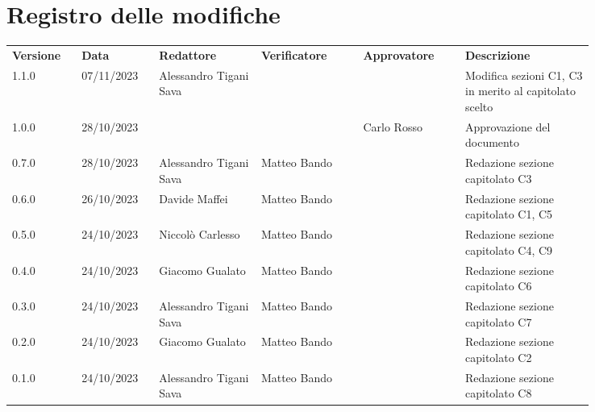 \section*{Registro delle modifiche}
{
\renewcommand{\arraystretch}{1.5}
\scriptsize
\begin{tabular}{p{0.10\linewidth}p{0.10\linewidth}p{0.15\linewidth}p{0.15\linewidth}p{0.15\linewidth}p{0.19\linewidth}}
    \textbf{Versione}   & \textbf{Data} & \textbf{Redattore}     & \textbf{Verificatore} & \textbf{Approvatore}  & \textbf{Descrizione}  \\
    1.1.0   & 07/11/2023    & Alessandro Tigani Sava &                  &   & Modifica sezioni C1, C3 in merito al capitolato scelto \\
    \hline
    1.0.0   & 28/10/2023    &						 &	                & Carlo Rosso & Approvazione del documento   \\
    \hline
    0.7.0   & 28/10/2023    & Alessandro Tigani Sava & Matteo Bando	    &   & Redazione sezione capitolato C3   \\
    \hline
    0.6.0   & 26/10/2023    & Davide Maffei          & Matteo Bando     &   & Redazione sezione capitolato C1, C5   \\   
    \hline 
    0.5.0   & 24/10/2023    & Niccolò Carlesso       & Matteo Bando     &   & Redazione sezione capitolato C4, C9  	\\
    \hline
    0.4.0   & 24/10/2023    & Giacomo Gualato        & Matteo Bando     &   & Redazione sezione capitolato C6  	\\
    \hline
    0.3.0   & 24/10/2023    & Alessandro Tigani Sava & Matteo Bando     &   & Redazione sezione capitolato C7   \\
    \hline
    0.2.0   & 24/10/2023    & Giacomo Gualato        & Matteo Bando     &   & Redazione sezione capitolato C2   \\
    \hline
    0.1.0   & 24/10/2023    & Alessandro Tigani Sava & Matteo Bando	    &   & Redazione sezione capitolato C8   \\    
    \hline
\end{tabular}
}
